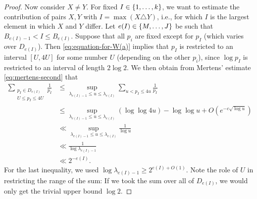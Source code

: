 \begin{proof}
    Now consider $X \ne Y$. 
    For fixed $I \in \left\{1, \dots, k\right\}$, we want to estimate the contribution of pairs $X, Y$ with $I = \max (X \triangle Y)$, i.e., for which $I$ is the largest element in which $X$ and $Y$ differ.
    Let $e(I) \in \left\{M, \dots, J\right\}$ be such that $B_{e(I) - 1} < I \le B_{e(I)}$.
    Suppose that all $p_i$ are fixed except for $p_I$ (which varies over $D_{e(I)}$).
    Then \eqref{eq:equation-for-W(a)} implies that $p_I$ is restricted to an interval $[U, 4U]$ for some number $U$ (depending on the other $p_i$), since $\log p_I$ is restricted to an interval of length $2\log 2$.
    We then obtain from Mertens' estimate \eqref{eq:mertens-second} that 
    \begin{align} \label{eq:bound-using-U}
        \sum \limits_{\substack{p_I \in D_{e(I)}\\U \le p_I \le 4U}} \frac{1}{p_I} 
            &\le \sup \limits_{\lambda_{e(I) - 1} \le u \le \lambda_{e(I)}} \sum \limits_{u < p_I \le 4u} \frac{1}{p_I}\nonumber \\
            &\le \sup \limits_{\lambda_{e(I) - 1} \le u \le \lambda_{e(I)}} (\log \log 4u) - \log \log u + O\left(e^{-c\sqrt{\log u}}\right)\nonumber \\
            &\ll \sup \limits_{\lambda_{e(I) - 1} \le u \le \lambda_{e(I)}} \frac{1}{\log u}\nonumber \\
            &\ll \frac{1}{\log \lambda_{e(I) - 1}}\nonumber \\
            &\ll 2^{-e(I)}.
    \end{align}
    For the last inequality, we used $\log \lambda_{e(I) - 1} \ge 2^{e(I) + O(1)}$.
    Note the role of $U$ in restricting the range of the sum: If we took the sum over all of $D_{e(I)}$, we would only get the trivial upper bound $\log 2$.


\end{proof}
